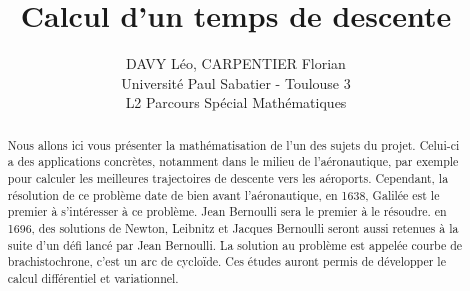 \documentclass[a4paper,10pt]{article}
\title{Calcul d'un temps de descente}
\author{DAVY L\'eo, CARPENTIER Florian \\
\small Universit\'e Paul Sabatier - Toulouse 3 \\
\small L2 Parcours Sp\'ecial Math\'ematiques}
\begin{document}
\maketitle
\newtheorem{theorem}{Theor\`eme}
\begin{abstract}
Nous allons ici vous pr\'esenter la math\'ematisation de l'un des sujets du projet. Celui-ci a des applications concr\`etes, notamment dans le milieu de l'a\'eronautique, par exemple
pour calculer les meilleures trajectoires de descente vers les a\'eroports. Cependant, la r\'esolution de ce probl\`eme date de bien avant l'a\'eronautique, en 1638, Galil\'ee est le premier \`a s'int\'eresser
\`a ce probl\`eme. Jean Bernoulli sera le premier \`a le r\'esoudre. en 1696, des solutions de Newton, Leibnitz et Jacques Bernoulli seront aussi retenues \`a la suite d'un d\'efi lanc\'e
par Jean Bernoulli. La solution au probl\`eme est appel\'ee courbe de brachistochrone, c'est un arc de cycloïde. Ces \'etudes auront permis de d\'evelopper le calcul diff\'erentiel et variationnel.
\end{abstract}
\end{document}
